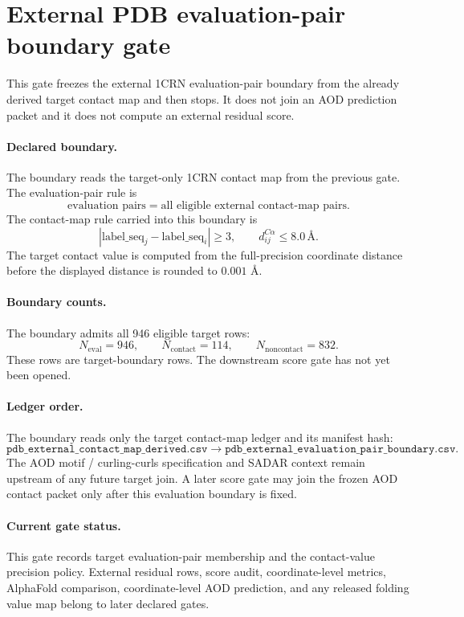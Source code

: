 
\section{External PDB evaluation-pair boundary gate}

This gate freezes the external 1CRN evaluation-pair boundary from the already derived target contact map and then stops.  It does not join an AOD prediction packet and it does not compute an external residual score.

\paragraph{Declared boundary.}
The boundary reads the target-only 1CRN contact map from the previous gate.  The evaluation-pair rule is
\[
  \text{evaluation pairs} = \text{all eligible external contact-map pairs}.
\]
The contact-map rule carried into this boundary is
\[
  |\mathrm{label\_seq}_j-\mathrm{label\_seq}_i|\geq 3,
  \qquad
  d_{ij}^{C\alpha}\leq 8.0\,\text{\AA}.
\]
The target contact value is computed from the full-precision coordinate distance before the displayed distance is rounded to $0.001$ \AA.

\paragraph{Boundary counts.}
The boundary admits all 946 eligible target rows:
\[
  N_{\mathrm{eval}}=946,
  \qquad
  N_{\mathrm{contact}}=114,
  \qquad
  N_{\mathrm{noncontact}}=832.
\]
These rows are target-boundary rows.  The downstream score gate has not yet been opened.

\paragraph{Ledger order.}
The boundary reads only the target contact-map ledger and its manifest hash:
\[
\texttt{pdb\_external\_contact\_map\_derived.csv}
\longrightarrow
\texttt{pdb\_external\_evaluation\_pair\_boundary.csv}.
\]
The AOD motif / curling-curls specification and SADAR context remain upstream of any future target join.  A later score gate may join the frozen AOD contact packet only after this evaluation boundary is fixed.

\paragraph{Current gate status.}
This gate records target evaluation-pair membership and the contact-value precision policy.  External residual rows, score audit, coordinate-level metrics, AlphaFold comparison, coordinate-level AOD prediction, and any released folding value map belong to later declared gates.
